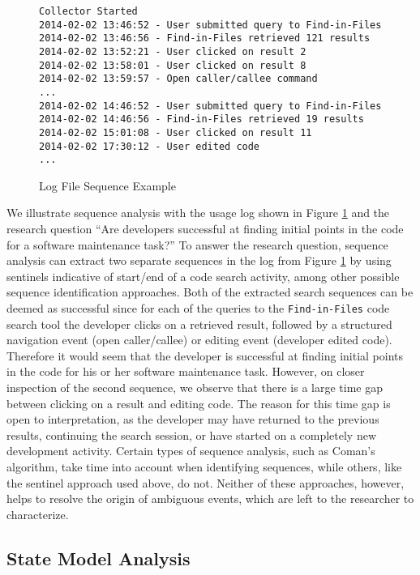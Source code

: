 \begin{figure}
\hrulefill
\begin{verbatim}
Collector Started
2014-02-02 13:46:52 - User submitted query to Find-in-Files
2014-02-02 13:46:56 - Find-in-Files retrieved 121 results
2014-02-02 13:52:21 - User clicked on result 2
2014-02-02 13:58:01 - User clicked on result 8
2014-02-02 13:59:57 - Open caller/callee command 
...
2014-02-02 14:46:52 - User submitted query to Find-in-Files
2014-02-02 14:46:56 - Find-in-Files retrieved 19 results
2014-02-02 15:01:08 - User clicked on result 11
2014-02-02 17:30:12 - User edited code
...
\end{verbatim}
\hrulefill
	\caption{Log File Sequence Example}
	\label{log:logFileSequence}
\end{figure}
We illustrate sequence analysis with the usage log shown in Figure \ref{log:logFileSequence} and the research question  ``Are developers successful at finding initial points in the code for a software maintenance task?''
To answer the research question, sequence analysis can extract two separate sequences in the log from Figure \ref{log:logFileSequence} by using sentinels indicative of start/end of a code search activity, among other possible sequence identification approaches. Both of the extracted search sequences can be deemed as successful since for each of the queries to the {\tt Find-in-Files} code search tool the developer clicks on a retrieved result, followed by a structured navigation event (open caller/callee) or editing event (developer edited code). Therefore it would seem that the developer is successful at finding initial points in the code for his or her software maintenance task. However, on closer inspection of the second sequence, we observe that there is a large time gap between clicking on a result and editing code. The reason for this time gap is open to interpretation, as the developer may have returned to the previous results, continuing the search session, or have started on a completely new development activity. Certain types of sequence analysis, such as Coman's algorithm, take time into account when identifying sequences, while others, like the sentinel approach used above, do not. Neither of these approaches, however, helps to resolve the origin of ambiguous events, which are left to the researcher to characterize.

\subsection{State Model Analysis}

